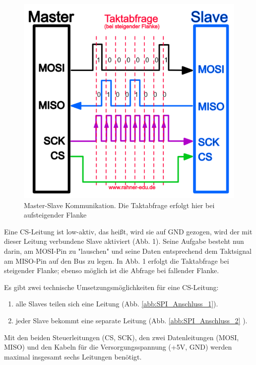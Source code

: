 \begin{figure}[H]
	\begin{center}
		\includegraphics[scale=0.4]{figures/hcis/spi_taktabfrage.png}
		\caption{Master-Slave Kommunikation. Die Taktabfrage erfolgt hier bei aufsteigender Flanke}
		\label{abb:Taktabfrage}
	\end{center}
\end{figure}

Eine CS-Leitung ist low-aktiv, das heißt, wird sie auf GND gezogen, wird der mit dieser Leitung verbundene Slave aktiviert (Abb. 1). Seine Aufgabe besteht nun darin, am MOSI-Pin zu "lauschen" und seine Daten entsprechend dem Taktsignal am MISO-Pin auf den Bus zu legen. In Abb. 1 erfolgt die Taktabfrage bei steigender Flanke; ebenso möglich ist die Abfrage bei fallender Flanke.

Es gibt zwei technische Umsetzungsmöglichkeiten für eine CS-Leitung:

\begin{enumerate}
	\item alle Slaves teilen sich eine Leitung (Abb. \ref{abb:SPI_Anschluss_1}).
	\item jeder Slave bekommt eine separate Leitung (Abb. \ref{abb:SPI_Anschluss_2} ).
\end{enumerate}

Mit den beiden Steuerleitungen (CS, SCK), den zwei Datenleitungen (MOSI, MISO) und den Kabeln für die Versorgungsspannung (+5V, GND) werden maximal insgesamt sechs Leitungen benötigt.

